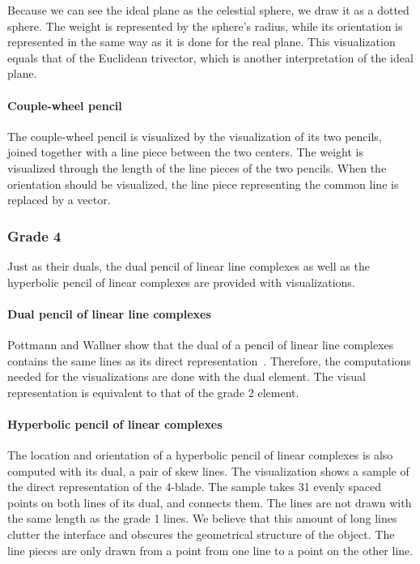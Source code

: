 Because we can see the ideal plane as the celestial sphere, we draw it as a dotted sphere.  The weight is represented by the sphere's radius, while its orientation is represented in the same way as it is done for the real plane.  This visualization equals that of the Euclidean trivector, which is another interpretation of the ideal plane.

\paragraph{Couple-wheel pencil}
The couple-wheel pencil is visualized by the visualization of its two pencils, joined together with a line piece between the two centers.  The weight is visualized through the length of the line pieces of the two pencils.  When the orientation should be visualized, the line piece representing the common line is replaced by a vector.

\subsubsection{Grade 4}
Just as their duals, the dual pencil of linear line complexes as well as the hyperbolic pencil of linear complexes are provided with visualizations.

\paragraph{Dual pencil of linear line complexes}
Pottmann and Wallner show that the dual of a pencil of linear line complexes contains the same lines as its direct representation~\cite[Section 3.2.1]{Pottmann}.  Therefore, the computations needed for the visualizations are done with the dual element.  The visual representation is equivalent to that of the grade 2 element.

\paragraph{Hyperbolic pencil of linear complexes}
The location and orientation of a hyperbolic pencil of linear complexes is also computed with its dual, a pair of skew lines.  The visualization shows a sample of the direct representation of the 4-blade.  The sample takes 31 evenly spaced points on both lines of its dual, and connects them.  The lines are not drawn with the same length as the grade 1 lines.  We believe that this amount of long lines clutter the interface and obscures the geometrical structure of the object.  The line pieces are only drawn from a point from one line to a point on the other line.

